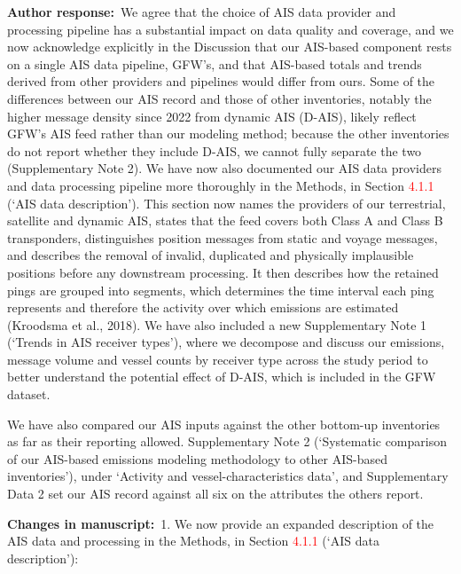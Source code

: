 \documentclass[11pt]{article}
\newcommand{\response}{\par\medskip\noindent%
  \textbf{\textcolor{respblue}{Author response:}}\ }
\newcommand{\changes}{\par\medskip\noindent%
  \textbf{\textcolor{changegreen}{Changes in manuscript:}}\ }
\begin{document}
\response We agree that the choice of AIS data provider and processing pipeline has a substantial impact on data quality and coverage, and we now acknowledge explicitly in the Discussion that our AIS-based component rests on a single AIS data pipeline, GFW's, and that AIS-based totals and trends derived from other providers and pipelines would differ from ours. Some of the differences between our AIS record and those of other inventories, notably the higher message density since 2022 from dynamic AIS (D-AIS), likely reflect GFW's AIS feed rather than our modeling method; because the other inventories do not report whether they include D-AIS, we cannot fully separate the two (Supplementary Note 2). We have now also documented our AIS data providers and data processing pipeline more thoroughly in the Methods, in Section \textcolor{red}{4.1.1} (`AIS data description'). This section now names the providers of our terrestrial, satellite and dynamic AIS, states that the feed covers both Class A and Class B transponders, distinguishes position messages from static and voyage messages, and describes the removal of invalid, duplicated and physically implausible positions before any downstream processing. It then describes how the retained pings are grouped into segments, which determines the time interval each ping represents and therefore the activity over which emissions are estimated (Kroodsma et al., 2018). We have also included a new Supplementary Note 1 (`Trends in AIS receiver types'), where we decompose and discuss our emissions, message volume and vessel counts by receiver type across the study period to better understand the potential effect of D-AIS, which is included in the GFW dataset.

We have also compared our AIS inputs against the other bottom-up inventories as far as their reporting allowed. Supplementary Note 2 (`Systematic comparison of our AIS-based emissions modeling methodology to other AIS-based inventories'), under `Activity and vessel-characteristics data', and Supplementary Data 2 set our AIS record against all six on the attributes the others report.

\changes 1. We now provide an expanded description of the AIS data and processing in the Methods, in Section \textcolor{red}{4.1.1} (`AIS data description'): 
\end{document}
